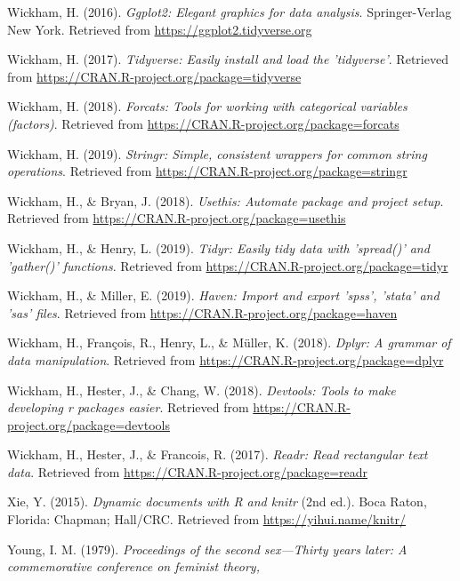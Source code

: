 \documentclass[man]{apa6}
\begin{document}
\hypertarget{ref-R-ggplot2}{}
Wickham, H. (2016). \emph{Ggplot2: Elegant graphics for data analysis}.
Springer-Verlag New York. Retrieved from
\url{https://ggplot2.tidyverse.org}

\hypertarget{ref-R-tidyverse}{}
Wickham, H. (2017). \emph{Tidyverse: Easily install and load the
'tidyverse'}. Retrieved from
\url{https://CRAN.R-project.org/package=tidyverse}

\hypertarget{ref-R-forcats}{}
Wickham, H. (2018). \emph{Forcats: Tools for working with categorical
variables (factors)}. Retrieved from
\url{https://CRAN.R-project.org/package=forcats}

\hypertarget{ref-R-stringr}{}
Wickham, H. (2019). \emph{Stringr: Simple, consistent wrappers for
common string operations}. Retrieved from
\url{https://CRAN.R-project.org/package=stringr}

\hypertarget{ref-R-usethis}{}
Wickham, H., \& Bryan, J. (2018). \emph{Usethis: Automate package and
project setup}. Retrieved from
\url{https://CRAN.R-project.org/package=usethis}

\hypertarget{ref-R-tidyr}{}
Wickham, H., \& Henry, L. (2019). \emph{Tidyr: Easily tidy data with
'spread()' and 'gather()' functions}. Retrieved from
\url{https://CRAN.R-project.org/package=tidyr}

\hypertarget{ref-R-haven}{}
Wickham, H., \& Miller, E. (2019). \emph{Haven: Import and export
'spss', 'stata' and 'sas' files}. Retrieved from
\url{https://CRAN.R-project.org/package=haven}

\hypertarget{ref-R-dplyr}{}
Wickham, H., François, R., Henry, L., \& Müller, K. (2018). \emph{Dplyr:
A grammar of data manipulation}. Retrieved from
\url{https://CRAN.R-project.org/package=dplyr}

\hypertarget{ref-R-devtools}{}
Wickham, H., Hester, J., \& Chang, W. (2018). \emph{Devtools: Tools to
make developing r packages easier}. Retrieved from
\url{https://CRAN.R-project.org/package=devtools}

\hypertarget{ref-R-readr}{}
Wickham, H., Hester, J., \& Francois, R. (2017). \emph{Readr: Read
rectangular text data}. Retrieved from
\url{https://CRAN.R-project.org/package=readr}

\hypertarget{ref-R-knitr}{}
Xie, Y. (2015). \emph{Dynamic documents with R and knitr} (2nd ed.).
Boca Raton, Florida: Chapman; Hall/CRC. Retrieved from
\url{https://yihui.name/knitr/}

\hypertarget{ref-young1979}{}
Young, I. M. (1979). \emph{Proceedings of the second sex---Thirty years
later: A commemorative conference on feminist theory,}

\endgroup
\end{document}
